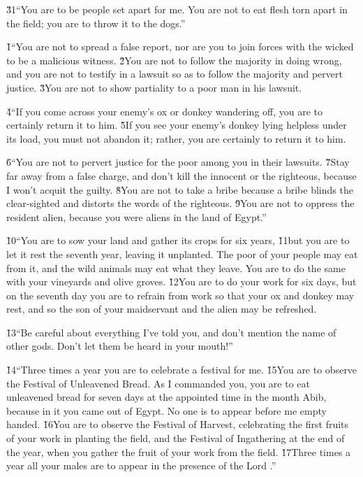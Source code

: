 \v{31}``You are to be people set apart for me. You are not to eat flesh torn apart in the field; you are to throw it to the dogs.''

\v{1}``You are not to spread a false report, nor are you to join forces with the wicked to be a malicious witness. \v{2}You are not to follow the majority in doing wrong, and you are not to testify in a lawsuit so as to follow the majority and pervert justice. \v{3}You are not to show partiality to a poor man in his lawsuit.

\v{4}``If you come across your enemy's ox or donkey wandering off, you are to certainly return it to him. \v{5}If you see your enemy's donkey lying helpless under its load, you must not abandon it; rather, you are certainly to return it to him.

\v{6}``You are not to pervert justice for the poor among you in their lawsuits. \v{7}Stay far away from a false charge, and don't kill the innocent or the righteous, because I won't acquit the guilty. \v{8}You are not to take a bribe because a bribe blinds the clear-sighted and distorts the words of the righteous. \v{9}You are not to oppress the resident alien, because you were aliens in the land of Egypt.''

\v{10}``You are to sow your land and gather its crops for six years, \v{11}but you are to let it rest the seventh year, leaving it unplanted. The poor of your people may eat from it, and the wild animals may eat what they leave. You are to do the same with your vineyards and olive groves. \v{12}You are to do your work for six days, but on the seventh day you are to refrain from work so that your ox and donkey may rest, and so the son of your maidservant and the alien may be refreshed.

\v{13}``Be careful about everything I've told you, and don't mention the name of other gods. Don't let them be heard in your mouth!''

\v{14}``Three times a year you are to celebrate a festival for me. \v{15}You are to observe the Festival of Unleavened Bread. As I commanded you, you are to eat unleavened bread for seven days at the appointed time in the month Abib, because in it you came out of Egypt. No one is to appear before me empty handed. \v{16}You are to observe the Festival of Harvest, celebrating the first fruits of your work in planting the field, and the Festival of Ingathering at the end of the year, when you gather the fruit of your work from the field. \v{17}Three times a year all your males are to appear in the presence of the Lord .''


